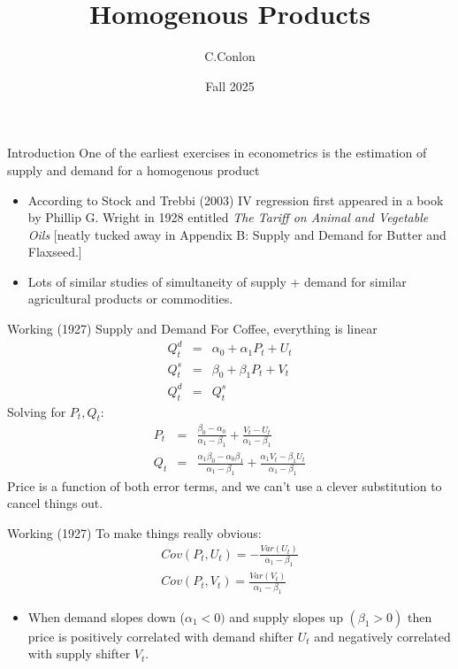 




\title [Homogenous Products]{Homogenous Products}
\author{C.Conlon}
\date{Fall 2025}


\begin{frame}
\titlepage
\end{frame}

\begin{frame}{Introduction}
One of the earliest exercises in econometrics is the estimation of supply and demand for a homogenous product
\begin{itemize}
\item According to Stock and Trebbi (2003) IV regression first appeared in a book by Phillip G. Wright in 1928 entitled \textit{The Tariff on Animal and Vegetable Oils} [neatly tucked away in Appendix B:  Supply and Demand for Butter and Flaxseed.]
\item Lots of similar studies of simultaneity of supply + demand for similar agricultural products or commodities.
\end{itemize}
\end{frame}

\begin{frame}{Working (1927)}
Supply and Demand For Coffee, everything is linear
\begin{eqnarray*}
Q_t^d &=& \alpha_0 + \alpha_1 P_t + U_t\\
Q_t^s &=& \beta_0 + \beta_1 P_t + V_t\\
Q_t^d &=& Q_t^s
\end{eqnarray*}
Solving for $P_t,Q_t$:
\begin{eqnarray*}
P_t &=& \frac{\beta_0 - \alpha_0}{\alpha_1 - \beta_1} + \frac{V_t - U_t}{\alpha_1 - \beta_1}\\
Q_t &=& \frac{\alpha_1 \beta_0 - \alpha_0 \beta_1}{\alpha_1 - \beta_1} + \frac{\alpha_1 V_t - \beta_1 U_t}{\alpha_1 - \beta_1}
\end{eqnarray*}
Price is a function of both error terms, and we can't use a clever substitution to cancel things out.
\end{frame}

\begin{frame}{Working (1927)}
To make things really obvious:
\begin{eqnarray*}
Cov(P_t,U_t) = - \frac{Var(U_t)}{\alpha_1 -\beta_1} \\
Cov(P_t,V_t) =  \frac{Var(V_t)}{\alpha_1 -\beta_1} 
\end{eqnarray*}
\begin{itemize}
\item When demand slopes down ($\alpha_1 < 0)$ and supply slopes up $(\beta_1 > 0)$ then price is positively correlated with demand shifter $U_t$ and negatively correlated with supply shifter $V_t$.
\end{itemize}
\end{frame}


